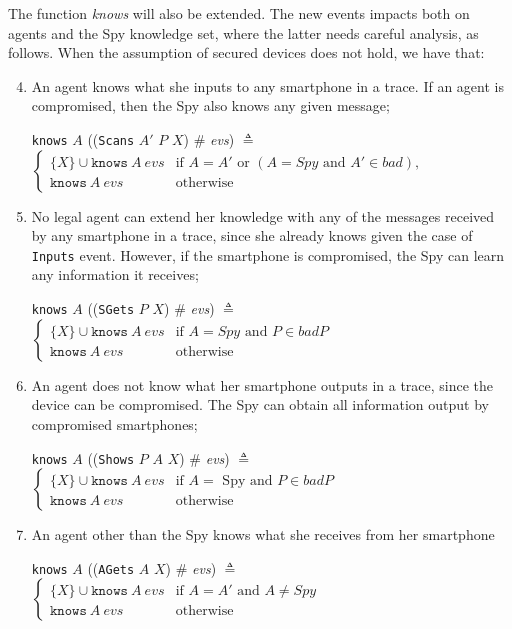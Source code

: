The function \textit{knows} will also be extended. The new events impacts both on agents and the Spy knowledge set, where the latter needs careful analysis, as follows. When the assumption of secured devices does not hold, we have that:
\begin{enumerate}
  \setcounter{enumi}{3}
  \item An agent knows what she inputs to any smartphone in a trace. If an agent is compromised, then the Spy also knows any given message;
  \begin{center}
    \texttt{knows} $A$ ((\texttt{Scans} $A'$ $P$ $X$) $\#$ \textit{evs}) $\triangleq$ $\begin{cases}
      \{ X\} \cup \texttt{knows}\ A\ evs & \text{if } A = A' \text{ or } (A = Spy \text{ and } A' \in bad), \\
      \texttt{knows}\ A\ evs & \text{otherwise}
    \end{cases}$
  \end{center}

  \item No legal agent can extend her knowledge with any of the messages received by any smartphone in a trace, since she already knows given the case of \texttt{Inputs} event. However, if the smartphone is compromised, the Spy can learn any information it receives;
  \begin{center}
    \texttt{knows} $A$ ((\texttt{SGets} $P$ $X$) $\#$ \textit{evs}) $\triangleq$ $\begin{cases}
      \{ X\} \cup \texttt{knows}\ A\ evs & \text{if } A = Spy \text{ and } P \in badP\\
      \texttt{knows}\ A\ evs & \text{otherwise}
    \end{cases}$
  \end{center}

  \item An agent does not know what her smartphone outputs in a trace, since the device can be compromised. The Spy can obtain all information output by compromised smartphones;
  \begin{center}
    \texttt{knows} $A$ ((\texttt{Shows} $P$ $A$ $X$) $\#$ \textit{evs}) $\triangleq$ $\begin{cases}
      \{ X\} \cup \texttt{knows}\ A\ evs & \text{if } A = \text{ Spy and } P \in badP \\
      \texttt{knows}\ A\ evs & \text{otherwise}
    \end{cases}$
  \end{center}

  \item An agent other than the Spy knows what she receives from her smartphone
  \begin{center}
    \texttt{knows} $A$ ((\texttt{AGets} $A$ $X$) $\#$ \textit{evs}) $\triangleq$ $\begin{cases}
      \{ X\} \cup \texttt{knows}\ A\ evs & \text{if } A = A' \text{ and } A \neq Spy \\
      \texttt{knows}\ A\ evs & \text{otherwise}
    \end{cases}$
  \end{center}
\end{enumerate}

